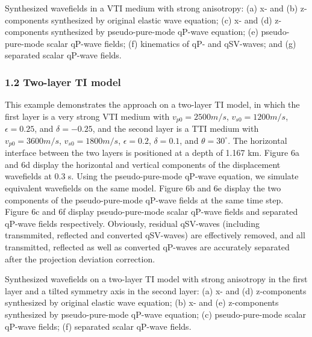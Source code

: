 {
Synthesized wavefields in a VTI medium with strong anisotropy: (a) x- and
(b) z-components synthesized by original elastic wave equation; (c) x- and
 (d) z-components synthesized by pseudo-pure-mode qP-wave equation; (e) pseudo-pure-mode scalar qP-wave fields; 
(f) kinematics of qP- and qSV-waves; and (g) separated scalar qP-wave fields.
}

\subsubsection{1.2 Two-layer TI model}

This example demonstrates the approach on a two-layer TI model, in which the first layer is a very
strong VTI medium with $v_{p0}=2500 m/s$, $v_{s0}=1200 m/s$, $\epsilon=0.25$, and $\delta=-0.25$, 
and the second layer is a TTI medium with $v_{p0}=3600 m/s$, $v_{s0}=1800 m/s$, 
$\epsilon=0.2$, $\delta=0.1$, and $\theta=30^{\circ}$. The horizontal interface between the two layers 
is positioned at a depth of 1.167 km.
 Figure 6a and 6d display the horizontal and vertical components of the displacement wavefields at 0.3 s.
 Using the pseudo-pure-mode qP-wave equation, we simulate equivalent wavefields on the same model.
Figure 6b and 6e display the two components of the pseudo-pure-mode qP-wave fields at the same time step.
Figure 6c and 6f display pseudo-pure-mode scalar qP-wave fields and separated qP-wave fields respectively.
Obviously, residual qSV-waves (including transmmited, reflected 
and converted qSV-waves) are effectively removed, and all transmitted, reflected as well as converted
qP-waves are accurately separated after the projection deviation correction.

{
Synthesized wavefields on a two-layer TI model with strong anisotropy in the first layer and
a tilted symmetry axis in the second layer: (a) x- and 
(d) z-components synthesized by original elastic wave equation; (b) x- and
 (e) z-components synthesized by pseudo-pure-mode qP-wave equation; 
 (c) pseudo-pure-mode scalar qP-wave fields; (f) separated scalar qP-wave fields.
}


